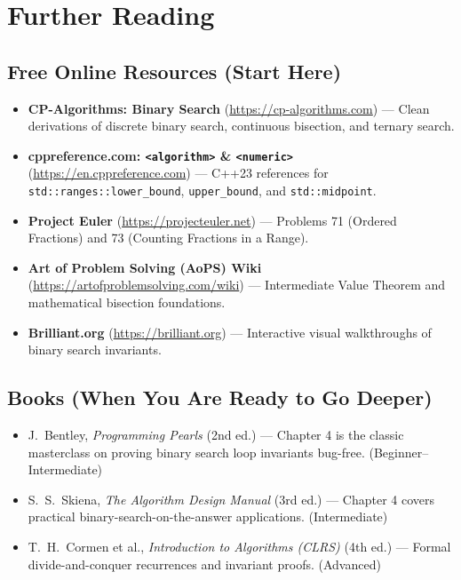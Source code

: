 \documentclass[11pt,a4paper]{article}
\theoremstyle{definition}
\begin{document}
\section{Further Reading}

\subsection*{Free Online Resources (Start Here)}
\begin{itemize}
    \item \textbf{CP-Algorithms: Binary Search} (\url{https://cp-algorithms.com}) --- Clean derivations of discrete binary search, continuous bisection, and ternary search.
    \item \textbf{cppreference.com: \texttt{<algorithm>} \& \texttt{<numeric>}} (\url{https://en.cppreference.com}) --- C++23 references for \texttt{std::ranges::lower\_bound}, \texttt{upper\_bound}, and \texttt{std::midpoint}.
    \item \textbf{Project Euler} (\url{https://projecteuler.net}) --- Problems 71 (Ordered Fractions) and 73 (Counting Fractions in a Range).
    \item \textbf{Art of Problem Solving (AoPS) Wiki} (\url{https://artofproblemsolving.com/wiki}) --- Intermediate Value Theorem and mathematical bisection foundations.
    \item \textbf{Brilliant.org} (\url{https://brilliant.org}) --- Interactive visual walkthroughs of binary search invariants.
\end{itemize}

\subsection*{Books (When You Are Ready to Go Deeper)}
\begin{itemize}
    \item J.\ Bentley, \emph{Programming Pearls} (2nd ed.) --- Chapter 4 is the classic masterclass on proving binary search loop invariants bug-free. (Beginner--Intermediate)
    \item S.\ S.\ Skiena, \emph{The Algorithm Design Manual} (3rd ed.) --- Chapter 4 covers practical binary-search-on-the-answer applications. (Intermediate)
    \item T.\ H.\ Cormen et al., \emph{Introduction to Algorithms (CLRS)} (4th ed.) --- Formal divide-and-conquer recurrences and invariant proofs. (Advanced)
\end{itemize}
\end{document}
